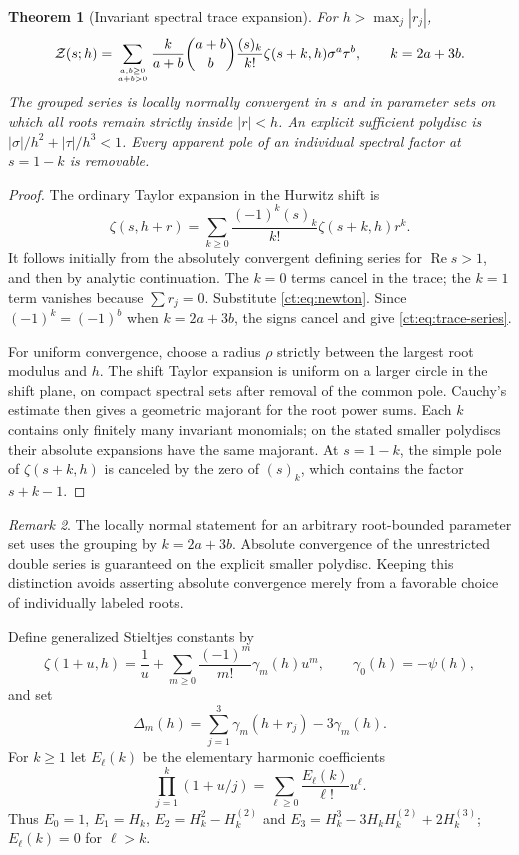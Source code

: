\documentclass[11pt]{article}
\numberwithin{equation}{section}
\newtheorem{theorem}{Theorem}[section]
\theoremstyle{definition}\newtheorem{definition}[theorem]{Definition}
\theoremstyle{remark}\newtheorem{remark}[theorem]{Remark}
\DeclareMathOperator{\Rea}{Re}
\newcommand{\Ztr}{\mathcal Z}
\begin{document}
\begin{theorem}[Invariant spectral trace expansion]\label{ct:thm:trace}
For $h>\max_j|r_j|$,
\begin{equation}\label{ct:eq:trace-series}
 \Ztr(s;h)=
 \sum_{a,b\ge0\atop a+b>0}
 \frac{k}{a+b}\binom{a+b}{b}
       \frac{(s)_k}{k!}\zeta(s+k,h)\sigma^a\tau^b,
       \qquad k=2a+3b.
\end{equation}
The grouped series is locally normally convergent in $s$ and in parameter
sets on which all roots remain strictly inside $|r|<h$. An explicit
sufficient polydisc is $|\sigma|/h^2+|\tau|/h^3<1$.
Every apparent pole of an individual spectral factor at $s=1-k$ is
removable.
\end{theorem}
\begin{proof}
The ordinary Taylor expansion in the Hurwitz shift is
\[
 \zeta(s,h+r)=\sum_{k\ge0}\frac{(-1)^k(s)_k}{k!}\zeta(s+k,h)r^k.
\]
It follows initially from the absolutely convergent defining series for
$\Rea s>1$, and then by analytic continuation. The $k=0$ terms cancel
in the trace; the $k=1$ term vanishes because $\sum r_j=0$.
Substitute \eqref{ct:eq:newton}. Since $(-1)^k=(-1)^b$ when $k=2a+3b$,
the signs cancel and give \eqref{ct:eq:trace-series}.

For uniform convergence, choose a radius $\rho$ strictly between the largest
root modulus and $h$. The shift Taylor expansion is uniform on a larger
circle in the shift plane, on compact spectral sets after removal of the
common pole. Cauchy's estimate then gives a geometric majorant for the
root power sums. Each $k$ contains only finitely many invariant monomials;
on the stated smaller polydiscs their absolute expansions have the same
majorant. At $s=1-k$, the simple pole of $\zeta(s+k,h)$ is canceled by
the zero of $(s)_k$, which contains the factor $s+k-1$.
\end{proof}
\begin{remark}
The locally normal statement for an arbitrary root-bounded parameter set
uses the grouping by $k=2a+3b$. Absolute convergence of the unrestricted
double series is guaranteed on the explicit smaller polydisc. Keeping this
distinction avoids asserting absolute convergence merely from a favorable
choice of individually labeled roots.
\end{remark}

Define generalized Stieltjes constants by
\begin{equation}\label{ct:eq:stieltjes-convention}
 \zeta(1+u,h)=\frac1u+\sum_{m\ge0}\frac{(-1)^m}{m!}\gamma_m(h)u^m,
 \qquad \gamma_0(h)=-\psi(h),
\end{equation}
and set
\[
 \Delta_m(h)=\sum_{j=1}^3\gamma_m(h+r_j)-3\gamma_m(h).
\]
For $k\ge1$ let $E_\ell(k)$ be the elementary harmonic coefficients
\begin{equation}\label{ct:eq:E}
 \prod_{j=1}^k(1+u/j)=\sum_{\ell\ge0}\frac{E_\ell(k)}{\ell!}u^\ell.
\end{equation}
Thus $E_0=1$, $E_1=H_k$, $E_2=H_k^2-H_k^{(2)}$ and
$E_3=H_k^3-3H_kH_k^{(2)}+2H_k^{(3)}$; $E_\ell(k)=0$ for $\ell>k$.
\end{document}
